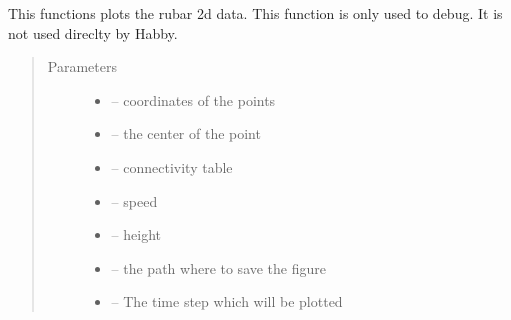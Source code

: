 \documentclass[letterpaper,10pt,english]{sphinxmanual}
\begin{document}

\begin{fulllineitems}
\label{\detokenize{index:src.rubar.figure_rubar2d}}
This functions plots the rubar 2d data. This function is only used to debug. It is not used direclty by Habby.
\begin{quote}\begin{description}
\item[{Parameters}] \leavevmode\begin{itemize}
\item {} 
 -- coordinates of the points

\item {} 
 -- the center of the point

\item {} 
 -- connectivity table

\item {} 
 -- speed

\item {} 
 -- height

\item {} 
 -- the path where to save the figure

\item {} 
 -- The time step which will be plotted

\end{itemize}

\end{description}\end{quote}

\end{fulllineitems}

\end{document}
